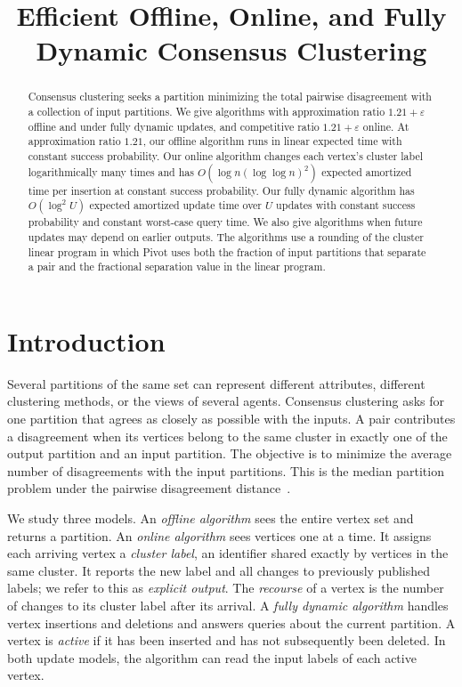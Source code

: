 \documentclass[11pt]{article}
\title{Efficient Offline, Online, and Fully Dynamic Consensus Clustering}
\author{}
\date{}
\begin{document}
\maketitle

\begin{abstract}
Consensus clustering seeks a partition minimizing the total pairwise
disagreement with a collection of input partitions. We give
algorithms with approximation ratio $1.21+\varepsilon$ offline and under
fully dynamic updates, and competitive ratio $1.21+\varepsilon$ online.
At approximation ratio $1.21$, our offline
algorithm runs in linear expected time with constant success probability. Our
online algorithm changes each vertex's cluster label logarithmically
many times and has
$O(\log n(\log\log n)^2)$ expected amortized time per insertion at
constant success probability. Our fully dynamic algorithm has $O(\log^2 U)$ expected amortized update
time over $U$ updates with constant success probability and constant worst-case
query time. We also give algorithms when future updates may depend on earlier outputs. The
algorithms use a rounding of the cluster linear program in which
Pivot uses both the fraction of input partitions that separate a pair
and the fractional separation value in the linear program.
\end{abstract}

\section{Introduction}
\label{sec:introduction}

Several partitions of the same set can represent different attributes,
different clustering methods, or the views of several agents. Consensus
clustering asks for one partition that agrees as closely as possible
with the inputs. A pair contributes a disagreement when its vertices belong to the same
cluster in exactly one of the output partition and an input partition.
The objective is to minimize the average number of disagreements
with the input partitions. This is the median partition problem
under the pairwise disagreement distance~\cite{ACN2008}.

We study three models. An \emph{offline algorithm} sees the entire vertex
set and returns a partition. An \emph{online algorithm} sees vertices one
at a time. It assigns each arriving vertex a \emph{cluster label}, an
identifier shared exactly by vertices in the same cluster. It reports
the new label and all changes to previously published labels; we refer
to this as
\emph{explicit output}. The \emph{recourse} of a vertex is the number of
changes to its cluster label after its arrival. A \emph{fully dynamic
algorithm} handles vertex insertions and deletions and answers queries
about the current partition. A vertex is \emph{active} if it has been
inserted and has not subsequently been deleted. In both update models,
the algorithm can read the input labels of each active vertex.
\end{document}
